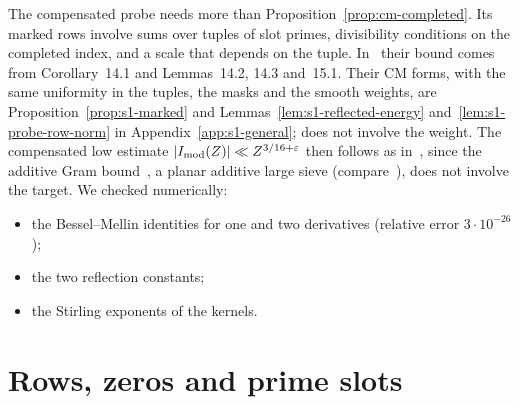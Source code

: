 \documentclass[11pt]{article}
\numberwithin{equation}{section}
\begin{document}
The compensated probe needs more than Proposition~\ref{prop:cm-completed}. Its marked rows involve sums over tuples
of slot primes, divisibility conditions on the completed index, and a scale that depends on the tuple.
In~\cite{OAI78} their bound comes from Corollary~14.1 and Lemmas~14.2,
14.3 and~15.1. Their CM forms, with the same uniformity in the tuples, the masks and
the smooth weights, are Proposition~\ref{prop:s1-marked} and Lemmas~\ref{lem:s1-reflected-energy}
and~\ref{lem:s1-probe-row-norm} in Appendix~\ref{app:s1-general}; \cite[Lemma~14.2]{OAI78} does not involve the weight. The
compensated low estimate $|I_{\rm mod}(Z)|\ll Z^{3/16+\varepsilon}$ then follows as
in~\cite[Prop.~15.3]{OAI78}, since the additive Gram bound~\cite[Prop.~15.2]{OAI78}, a planar additive large sieve (compare~\cite{Hux68}), does not
involve the target.
We checked numerically:
\begin{itemize}
\item the Bessel--Mellin identities for one and two derivatives (relative error
 $3\cdot10^{-26}$);
\item the two reflection constants;
\item the Stirling exponents of the kernels.
\end{itemize}

\section{Rows, zeros and prime slots}\label{sec:78rows}
\end{document}
